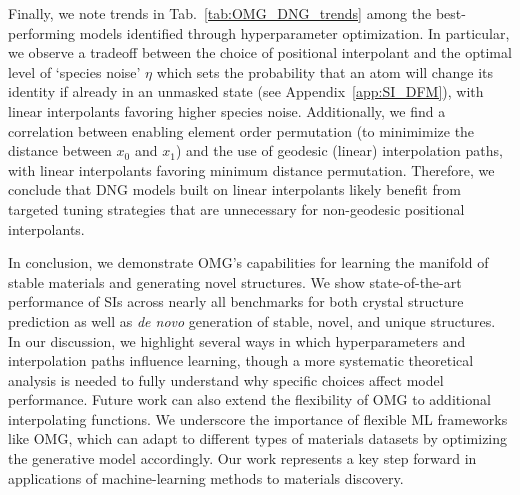Finally, we note trends in Tab.~\ref{tab:OMG_DNG_trends} among the best-performing models identified through hyperparameter optimization.
In particular, we observe a tradeoff between the choice of positional interpolant and the optimal level of `species noise' $\eta$ which sets the probability that an atom will change its identity if already in an unmasked state (see Appendix~\ref{app:SI_DFM}), with linear interpolants favoring higher species noise.
Additionally, we find a correlation between enabling element order permutation (to minimimize the distance between $x_0$ and $x_1$) and the use of geodesic (linear) interpolation paths,  with linear interpolants favoring minimum distance permutation.
Therefore, we conclude that DNG models built on linear interpolants likely benefit from targeted tuning strategies that are unnecessary for non-geodesic positional interpolants.

\begin{table}[htbp]
\caption{Optimally performing DNG trials from OMG. All models are trained with an ODE sampling scheme and ordered by decreasing species noise $\eta$. The values of whether the element ordering is permuted to minimize traveled distance is also included.}
\label{tab:OMG_DNG_trends}
\centering
{}
\end{table}

In conclusion, we demonstrate OMG's capabilities for learning the manifold of stable materials and generating novel structures.
We show state-of-the-art performance of SIs across nearly all benchmarks for both crystal structure prediction as well as \textit{de novo} generation of stable, novel, and unique structures.
In our discussion, we highlight several ways in which hyperparameters and interpolation paths influence learning, though a more systematic theoretical analysis is needed to fully understand why specific choices affect model performance. 
Future work can also extend the flexibility of OMG to additional interpolating functions.
We underscore the importance of flexible ML frameworks like OMG, which can adapt to different types of materials datasets by optimizing the generative model accordingly. 
Our work represents a key step forward in applications of machine-learning methods to materials discovery.

